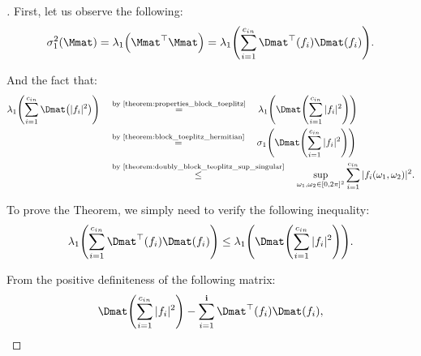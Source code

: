 \begingroup
\addtolength{\jot}{1.5em}

\begin{proof}[]
First, let us observe the following:
\begin{equation}
    \sigma_1^2 \left( \Mmat \right) = \lambda_1 \left( \Mmat^{\top} \Mmat \right) = \lambda_1 \left( \sum_{i=1}^{\cin} \Dmat^{\top} \left(f_i \right) \Dmat (f_i) \right).
\end{equation}

And the fact that:
\begin{align}
    \lambda_1 \left( \sum_{i=1}^{\cin} \Dmat \left(|f_i|^2 \right) \right) \quad &\stackrel{\text{by \Cref{theorem:properties_block_toeplitz}}}{=} \quad \lambda_1 \left( \Dmat \left( \sum_{i=1}^{\cin} |f_i|^2 \right) \right) \\ 
    \quad &\stackrel{\text{by \Cref{theorem:block_toeplitz_hermitian}}}{=} \quad \sigma_1 \left( \Dmat \left( \sum_{i=1}^{\cin} |f_i|^2 \right) \right) \\
    \quad &\stackrel{\text{by \Cref{theorem:doubly_block_teoplitz_sup_singular}}}{\leq} \quad \sup_{\omega_1, \omega_2 \in [0, 2\pi]^2} \sum_{i=1}^{\cin} |f_i(\omega_1, \omega_2)|^2.
\end{align}

\noindent
To prove the Theorem, we simply need to verify the following inequality:
\begin{equation} \label{equation:eq2}
    \lambda_1 \left( \sum_{i=1}^{\cin} \Dmat^{\top} \left(f_i \right) \Dmat (f_i) \right) \leq \lambda_1 \left( \Dmat \left( \sum_{i=1}^{\cin} |f_i|^2 \right) \right). 
\end{equation}

\noindent
From the positive definiteness of the following matrix:
\begin{equation}
    \Dmat \left( \sum_{i=1}^{\cin} |f_i|^2 \right) - \sum_{i=1}^{\ci} \Dmat^{\top} \left(f_i \right) \Dmat (f_i),
\end{equation}


\end{proof}
